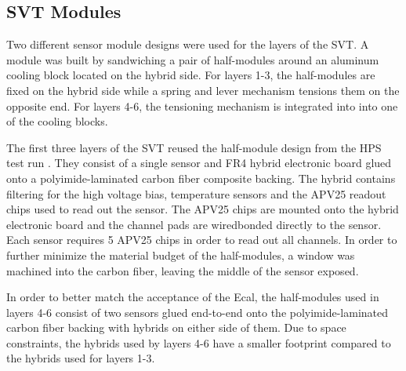 \subsection{SVT Modules}

Two different sensor module designs were used for the layers of the SVT.
A module was built by sandwiching a pair of half-modules around an aluminum 
cooling block located on the hybrid side. For layers 1-3, the half-modules are 
fixed on the hybrid side while a spring and lever mechanism tensions them on
the opposite end.  For layers 4-6, the tensioning mechanism is integrated into
into one of the cooling blocks.

The first three layers of the SVT reused the half-module design from the HPS 
test run \cite{Battaglieri:2014hga}. They consist of a single sensor
and FR4 hybrid electronic board glued onto a polyimide-laminated carbon fiber
composite backing. The hybrid contains filtering for the high voltage bias, temperature
sensors and the APV25 readout chips used to read out the sensor. The APV25 chips
are mounted 
onto the hybrid electronic board and the channel pads are wiredbonded directly
to the sensor. Each sensor requires 5 APV25 chips in order to read out all channels.
In order to further minimize the material budget of the half-modules, 
a window 
was machined into the carbon fiber, leaving the middle of the sensor exposed.

In order to better match the acceptance of the Ecal, 
the half-modules used in layers 4-6 consist of two sensors glued end-to-end onto
the polyimide-laminated carbon fiber backing with hybrids on either side of them.
Due to space constraints, the hybrids used by layers 4-6 have a smaller footprint
compared to the hybrids used for layers 1-3.


